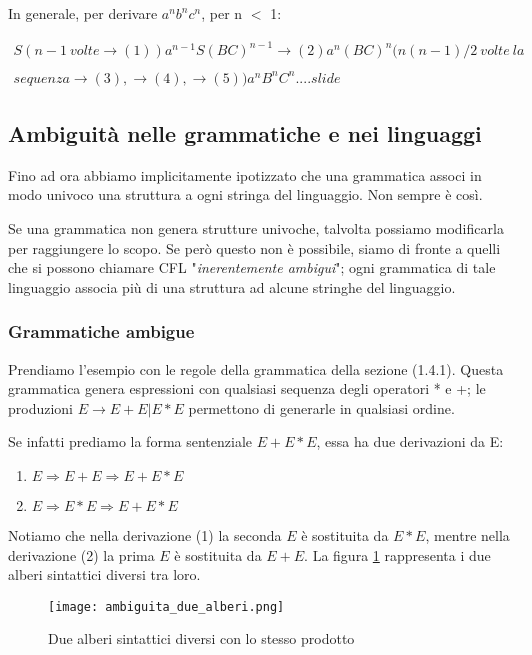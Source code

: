 \documentclass[11pt]{article}
\begin{document}
In generale, per derivare $a^nb^nc^n$, per n $<$ 1:

\begin{equation*}
\begin{split}
S(n-1 \medspace volte \rightarrow (1)) a^{n-1}S(BC)^{n-1}\rightarrow (2) a^n(BC)^n(n(n-1)/2 \medspace volte \medspace la \\&\\ sequenza \rightarrow (3), \rightarrow (4), \rightarrow (5))a^nB^nC^n....slide
\end{split}
\end{equation*}

\subsection{Ambiguità nelle grammatiche e nei linguaggi}
Fino ad ora abbiamo implicitamente ipotizzato che una grammatica associ in modo univoco una struttura a ogni stringa del linguaggio. Non sempre è così. 

Se una grammatica non genera strutture univoche, talvolta possiamo modificarla per raggiungere lo scopo. Se però questo non è possibile, siamo di fronte a quelli che si possono chiamare CFL "\textit{inerentemente ambigui}"; ogni grammatica di tale linguaggio associa più di una struttura ad alcune stringhe del linguaggio.

\subsubsection{Grammatiche ambigue}
Prendiamo l'esempio con le regole della grammatica della sezione (1.4.1). Questa grammatica genera espressioni con qualsiasi sequenza degli operatori * e +; le produzioni $E \rightarrow E +E |E*E$ permettono di generarle in qualsiasi ordine.

Se infatti prediamo la forma sentenziale $E+E*E$, essa ha due derivazioni da E:
\begin{enumerate}
	\item $E \Rightarrow E+E \Rightarrow E+E*E$
	\item $E \Rightarrow E*E \Rightarrow E+E*E$
\end{enumerate} 
Notiamo che nella derivazione (1) la seconda $E$ è sostituita da $E*E$, mentre nella derivazione (2) la prima $E$ è sostituita da $E+E$. La figura \ref{img:ambiguita_due_alberi} rappresenta i due alberi sintattici diversi tra loro.

\begin{figure}[H]
\caption{Due alberi sintattici diversi con lo stesso prodotto}
\label{img:ambiguita_due_alberi}
\texttt{[image: ambiguita\_due\_alberi.png]}
\centering
\end{figure}
\end{document}
